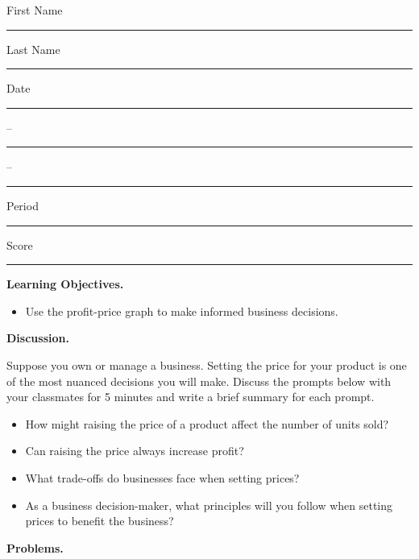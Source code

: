 \documentclass[twoside, 10pt]{article}
\title{}
\date{}
\begin{document}
\noindent
{\large
First Name \rule{6em}{.1pt}Last Name \rule{6em}{.1pt} Date \rule{1.5em}{.1pt} -- \rule{1.5em}{.1pt} -- \rule{1.5em}{.1pt} Period \rule{2em}{.1pt} Score \rule{2em}{.1pt}
}
\vspace{1em}

{\noindent \bf Learning Objectives.}
\begin{itemize}
\item
Use the profit-price graph to make informed business decisions.
\end{itemize}
{\noindent\bf Discussion.}

Suppose you own or manage a business. Setting the price for your product is one of the most nuanced decisions you will make. Discuss the prompts below with your classmates for 5 minutes and write a brief summary for each prompt.

\begin{itemize}
\item
How might raising the price of a product affect the number of units sold?
\item 
Can raising the price always increase profit?
\item 
What trade-offs do businesses face when setting prices?
\item As a business decision-maker, what principles will you follow when setting prices to benefit the business?
\end{itemize}

{\noindent\bf Problems.}
\end{document}

